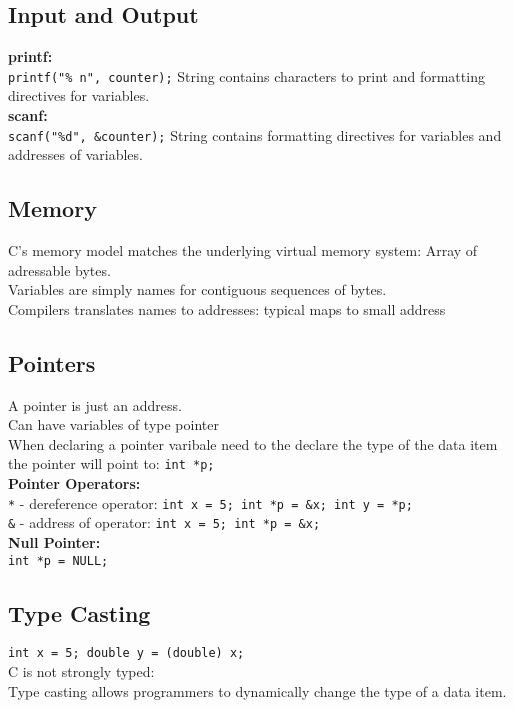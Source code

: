 \documentclass[answers,12pt,addpoints]{exam}
\begin{document}
\subsection{Input and Output}
\textbf{printf:} \\
\texttt{printf("\% n", counter);} String contains characters to print and formatting directives for variables. \\
\textbf{scanf:} \\
\texttt{scanf("\%d", \&counter);} String contains formatting directives for variables and addresses of variables. \\

\subsection{Memory}
C's memory model matches the underlying virtual memory system: Array of adressable bytes. \\
Variables are simply names for contiguous sequences of bytes. \\
Compilers translates names to addresses: typical maps to small address
\subsection{Pointers}
A pointer is just an address.\\
Can have variables of type pointer\\
When declaring a pointer varibale need to the declare the type of the data item the pointer will point to: \texttt{int *p;} \\
\textbf{Pointer Operators:} \\
\texttt{*} - dereference operator: \texttt{int x = 5; int *p = \&x; int y = *p;} \\
\texttt{\&} - address of operator: \texttt{int x = 5; int *p = \&x;} \\
\textbf{Null Pointer:} \\
\texttt{int *p = NULL;} \\

\subsection{Type Casting}
\texttt{int x = 5; double y = (double) x;} \\
C is not strongly typed: \\
Type casting allows programmers to dynamically change the type of a data item. \\
\end{document}
